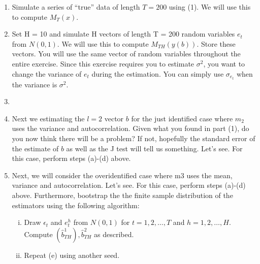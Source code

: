 \documentclass{article} %
\DeclareMathOperator*{\E}{\mathbb{E}} %
\theoremstyle{definition}
\newenvironment{solution}[1][Answer]{\begin{singlespace}\underline{\textbf{#1:}}\quad }{\ \rule{0.3em}{0.3em}\end{singlespace}} %
\begin{document}
\begin{enumerate}
\begin{solution}
			Both the variance and the first order correlation are informative for estimating $ b $. This is because we can estimate the true parameters given the two moments as follows,
			\begin{align*}
				\rho_0 = \frac{ \E[(x_t - \E[x_t]) (x_{t-1} - \E[x_{t-1}]) ] }{ 	\E[(x_t - \E[x_t])^2]  } && \sigma^2 =  \E[(x_t - \E[x_t])^2] -  \frac{ \E[(x_t - \E[x_t]) (x_{t-1} - \E[x_{t-1}]) ] }{ 	\E[(x_t - \E[x_t])^2]  }
			\end{align*}
		\end{solution}
		\item Simulate a series of “true” data of length $ T = 200 $ using (1). We will use this to compute
		$ M_T (x) $.
		
		\item Set H = 10 and simulate H vectors of length T = 200 random variables $ e_t $ from $ N(0, 1) $. We will use this to compute $ M_{TH}(y(b)) $. Store these vectors. You will use the same vector of random variables throughout the entire exercise. Since this exercise requires you to estimate $ \sigma^2 $, you want to change the variance of $ e_t $ during the estimation. You can simply use $ \sigma_{e_t} $ when the variance is $ \sigma^2 $.
		
		\item 
		
		\item Next we estimating the $ l = 2 $ vector $ b $ for the just identified case where $ m_2 $ uses the variance and autocorrelation. Given what you found in part (1), do you now think there will be a problem? If not, hopefully the standard error of the estimate of $ b $ as well as the J test will tell us something. Let’s see. For this case, perform steps (a)-(d) above.
		
		\item Next, we will consider the overidentified case where m3 uses the mean, variance and autocorrelation. Let’s see. For this case, perform steps (a)-(d) above. Furthermore, bootstrap the the finite sample distribution of the estimators using the following algorithm:
		\begin{enumerate}[i.]
			\item Draw $ \epsilon_t $ and $ e_t^h $ from $ N(0,1) $ for $ t = 1,2,\hdots,T $ and $ h = 1,2,\hdots,H $. Compute $ (\hat{b}_{TH}^1), \hat{b}_{TH}^2 $ as described.
			
			\item Repeat (e) using another seed.
		\end{enumerate}
	
	\end{enumerate}
\end{document}
